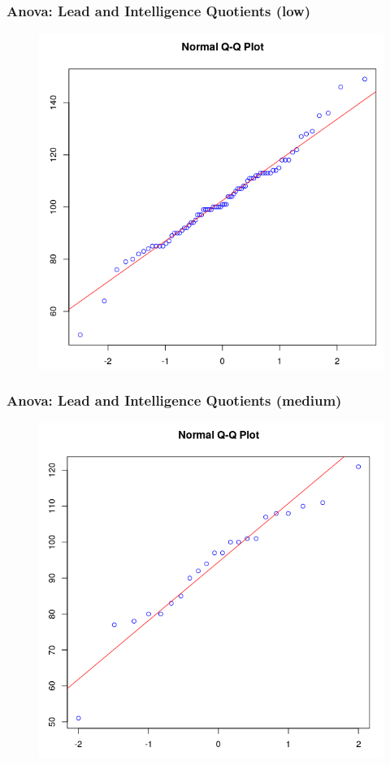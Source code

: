 \documentclass[xcolor=dvipsnames]{beamer}
\begin{document}
\begin{frame}
  \frametitle{Anova: Lead and Intelligence Quotients (low)}
  \begin{figure}[h]
    \includegraphics[scale=0.35]{./diagrams/lead_l.png}
  \end{figure}
\end{frame}

\begin{frame}
  \frametitle{Anova: Lead and Intelligence Quotients (medium)}
  \begin{figure}[h]
    \includegraphics[scale=0.35]{./diagrams/lead_m.png}
  \end{figure}
\end{frame}
\end{document}
